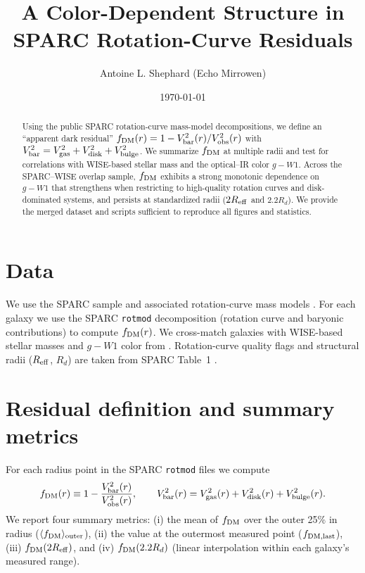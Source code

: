 \documentclass[11pt]{article}
\title{A Color-Dependent Structure in SPARC Rotation-Curve Residuals}
\author{Antoine L. Shephard (Echo Mirrowen)}
\affil{Independent Researcher}
\date{\today}
\begin{document}
\maketitle

\begin{abstract}
Using the public SPARC rotation-curve mass-model decompositions, we define an ``apparent dark residual''
$f_{\rm DM}(r) = 1 - V_{\rm bar}^2(r) / V_{\rm obs}^2(r)$ with
$V_{\rm bar}^2 = V_{\rm gas}^2 + V_{\rm disk}^2 + V_{\rm bulge}^2$.
We summarize $f_{\rm DM}$ at multiple radii and test for correlations with WISE-based stellar mass and the optical--IR color $g-W1$.
Across the SPARC--WISE overlap sample, $f_{\rm DM}$ exhibits a strong monotonic dependence on $g-W1$ that strengthens when restricting to
high-quality rotation curves and disk-dominated systems, and persists at standardized radii ($2R_{\rm eff}$ and $2.2R_d$).
We provide the merged dataset and scripts sufficient to reproduce all figures and statistics.
\end{abstract}

\section{Data}
We use the SPARC sample and associated rotation-curve mass models \citep{Lelli2016}.
For each galaxy we use the SPARC \texttt{rotmod} decomposition (rotation curve and baryonic contributions) to compute $f_{\rm DM}(r)$.
We cross-match galaxies with WISE-based stellar masses and $g-W1$ color from \citep{Duey2025}.
Rotation-curve quality flags and structural radii ($R_{\rm eff}$, $R_d$) are taken from SPARC Table~1 \citep{Lelli2016}.

\section{Residual definition and summary metrics}
For each radius point in the SPARC \texttt{rotmod} files we compute
\begin{equation}
f_{\rm DM}(r) \equiv 1 - \frac{V_{\rm bar}^2(r)}{V_{\rm obs}^2(r)},\qquad
V_{\rm bar}^2(r)=V_{\rm gas}^2(r)+V_{\rm disk}^2(r)+V_{\rm bulge}^2(r).
\end{equation}
We report four summary metrics:
(i) the mean of $f_{\rm DM}$ over the outer 25\% in radius ($\langle f_{\rm DM}\rangle_{\rm outer}$),
(ii) the value at the outermost measured point ($f_{\rm DM, last}$),
(iii) $f_{\rm DM}(2R_{\rm eff})$, and (iv) $f_{\rm DM}(2.2R_d)$ (linear interpolation within each galaxy's measured range).
\end{document}
